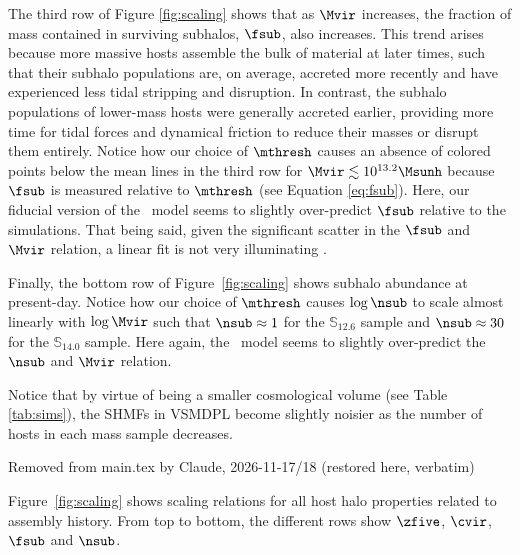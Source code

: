  The third row of Figure \ref{fig:scaling} shows that as $\Mvir$ increases, the fraction of mass contained in surviving subhalos, $\fsub$, also increases. This trend arises because more massive hosts assemble the bulk of material at later times, such that their subhalo populations are, on average, accreted more recently and have experienced less tidal stripping and disruption. In contrast, the subhalo populations of lower-mass hosts were generally accreted earlier, providing more time for tidal forces and dynamical friction to reduce their masses or disrupt them entirely. Notice how our choice of $\mthresh$ causes an absence of colored points below the mean lines in the third row for $\Mvir \lesssim 10^{13.2} \Msunh$ because $\fsub$ is measured relative to $\mthresh$ (see Equation \ref{eq:fsub}). Here, our fiducial version of the \SatGen\ model seems to slightly over-predict $\fsub$ relative to the simulations. That being said, given the significant scatter in the $\fsub$ and $\Mvir$ relation, a linear fit is not very illuminating \citep{Jiang.vdBosch.16}.

Finally, the bottom row of Figure~\ref{fig:scaling} shows subhalo abundance at present-day. Notice how our choice of $\mthresh$ causes $\log \nsub$ to scale almost linearly with $\log \Mvir$ such that $\nsub \approx 1$ for the $\mathbb{S}_{12.6}$ sample and $\nsub \approx 30$ for the $\mathbb{S}_{14.0}$ sample. Here again, the \SatGen\ model seems to slightly over-predict the $\nsub$ and $\Mvir$ relation. 

Notice that by virtue of being a smaller cosmological volume (see Table \ref{tab:sims}), the SHMFs in VSMDPL become slightly noisier as the number of hosts in each mass sample decreases.

Removed from main.tex by Claude, 2026-11-17/18 (restored here, verbatim)

Figure~\ref{fig:scaling} shows scaling relations for all host halo properties related to assembly history. From top to bottom, the different rows show $\zfive$, $\cvir$, $\fsub$ and $\nsub$.



